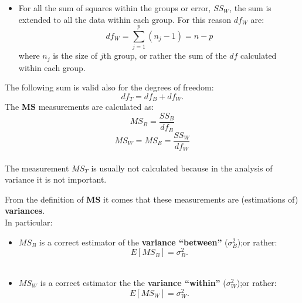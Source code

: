 \begin{frame}
  \vspace*{.5cm}
  \begin{itemize}
    \item For all the sum of squares within the groups or error, {\boldmath$SS_W$}, the sum is extended to all the data within each group. For this reason {\boldmath$df_W$} are:
      $$ df_W = \sum_{j=1}^p{(n_j-1)} = n-p $$
      where {\boldmath $ n_j $} is the size of $ j $th group, or rather the sum of the $ df $ calculated within each group.
  \end{itemize}
\end{frame}

\begin{frame}
  \vspace*{.25cm}
  The following sum is valid also for the degrees of freedom:
  $$ df_T = df_B + df_W \mbox{.} $$
  The \textbf{MS} measurements are calculated as:
  $$ MS_B = \frac{SS_B}{df_B} $$
  $$ MS_W = MS_E = \frac{SS_W}{df_W} $$\\
  \vspace*{.6cm}
  The measurement {\boldmath$MS_T$} is usually not calculated because in the analysis of variance it is not important.
\end{frame}

\begin{frame}
  \vspace*{.25cm}
  From the definition of \textbf{MS} it comes that these measurements are (estimations of) \textbf{variances}.\\
  \vspace*{.5cm}
  In particular:
  \begin{itemize}
    \item  {\boldmath$MS_B$} is a correct estimator of the \textbf{variance ``between''} ($\sigma^2_B$);\newline or rather:
      $$ E \left[ MS_B \right] = \sigma^2_B \mbox{.} $$\\
    \vspace*{.25cm}
    \item {\boldmath$MS_W$} is a correct estimator the the \textbf{variance ``within''} ($\sigma^2_W$);\newline or rather:
      $$ E \left[ MS_W \right] = \sigma^2_W \mbox{.} $$
  \end{itemize}
\end{frame}


